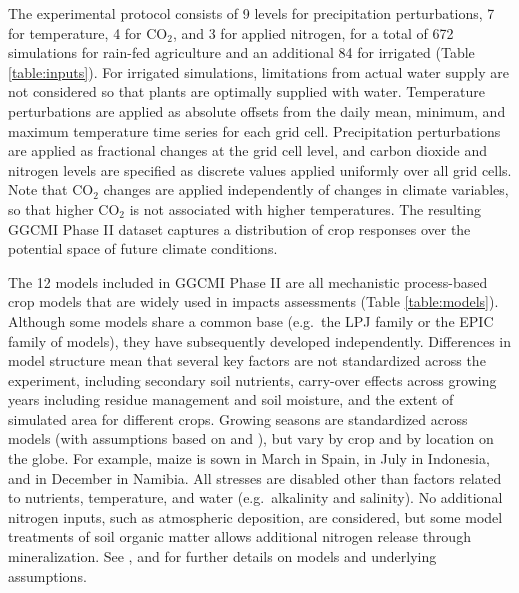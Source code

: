 \documentclass[esd, final]{copernicus} %
\begin{document}
\vspace{-0.05in}
The experimental protocol consists of 9 levels for precipitation perturbations, 7 for temperature, 4 for CO$_2$, and 3 for applied nitrogen, for a total of 672 simulations for rain-fed agriculture and an additional 84 for irrigated (Table \ref{table:inputs}). For irrigated simulations, limitations from actual water supply are not considered so that plants are optimally supplied with water. Temperature perturbations are applied as absolute offsets from the daily mean, minimum, and maximum temperature time series for each grid cell. Precipitation perturbations are applied as fractional changes at the grid cell level, and carbon dioxide and nitrogen levels are specified as discrete values applied uniformly over all grid cells. Note that CO$_2$ changes are applied independently of changes in climate variables, so that higher CO$_2$ is not associated with higher temperatures. The resulting GGCMI Phase II dataset captures a distribution of crop responses over the potential space of future climate conditions.


The 12 models included in GGCMI Phase II are all mechanistic process-based crop models that are widely used in impacts assessments (Table \ref{table:models}). Although some models share a common base (e.g.\ the LPJ family or the EPIC family of models), they have subsequently developed independently. Differences in model structure mean that several key factors are not standardized across the experiment, including secondary soil nutrients, carry-over effects across growing years including residue management and soil moisture, and the extent of simulated area for different crops. Growing seasons are standardized across models (with assumptions based on \citet{Sacks2010} and \citet{Portmann2008, Portmann2010}), but vary by crop and by location on the globe. For example, maize is sown in March in Spain, in July in Indonesia, and in December in Namibia. All stresses are disabled other than factors related to nutrients, temperature, and water (e.g.\ alkalinity and salinity). No additional nitrogen inputs, such as atmospheric deposition, are considered, but some model treatments of soil organic matter allows additional nitrogen release through mineralization. See \citet{Rosenzweig2014}, \citet{Elliott2015} and \citet{muller_global_2017} for further details on models and underlying assumptions.
\end{document}
